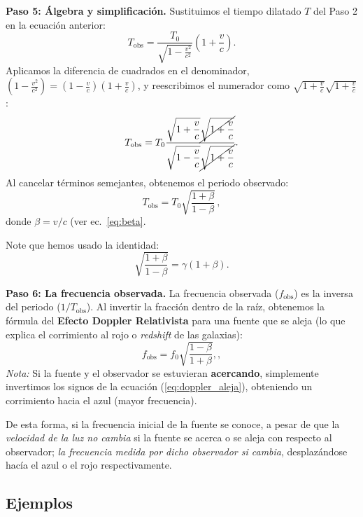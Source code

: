 \documentclass[11pt,a4paper]{book}
\begin{document}
\textbf{Paso 5: Álgebra y simplificación.} Sustituimos el tiempo dilatado $T$ del Paso 2 en la ecuación anterior:
\begin{equation}
    T_{\text{obs}} = \frac{T_0}{\sqrt{1 - \frac{v^2}{c^2}}} \left(1 + \frac{v}{c}\right).
\end{equation}
Aplicamos la diferencia de cuadrados en el denominador, $\left(1 - \frac{v^2}{c^2}\right) = \left(1 - \frac{v}{c}\right)\left(1 + \frac{v}{c}\right)$, y reescribimos el numerador como $\sqrt{1 + \frac{v}{c}} \sqrt{1 + \frac{v}{c}}$:
\begin{equation}
    T_{\text{obs}} = T_0 \frac{\sqrt{1 + \dfrac{v}{c}} \cancel{\sqrt{1 + \dfrac{v}{c}}}}{\sqrt{1 - \dfrac{v}{c}}\cancel{ \sqrt{1 + \dfrac{v}{c}}}}.
\end{equation}
Al cancelar términos semejantes, obtenemos el periodo observado:
\begin{equation}
    T_{\text{obs}} = T_0 \sqrt{\frac{1 + \beta}{1 - \beta}}\,,
\end{equation}
donde $\beta=v/c$ (ver ec.~\eqref{eq:beta}.

Note que hemos usado la identidad:
\begin{equation}
\label{eq:doppid}
 \sqrt{\frac{1+\beta}{1-\beta}} =   \gamma (1+\beta).
\end{equation}


\textbf{Paso 6: La frecuencia observada.} La frecuencia observada ($f_{\text{obs}}$) es la inversa del periodo ($1 / T_{\text{obs}}$). Al invertir la fracción dentro de la raíz, obtenemos la fórmula del \textbf{Efecto Doppler Relativista} para una fuente que se aleja (lo que explica el corrimiento al rojo o \textit{redshift} de las galaxias):
\begin{equation}
    f_{\text{obs}} = f_0 \sqrt{\frac{1 - \beta}{1 + \beta}},,
    \label{eq:doppler_aleja}
\end{equation}
\textit{Nota:} Si la fuente y el observador se estuvieran \textbf{acercando}, simplemente invertimos los signos de la ecuación (\ref{eq:doppler_aleja}), obteniendo un corrimiento hacia el azul (mayor frecuencia).

De esta forma, si la frecuencia inicial de la fuente se conoce, a pesar de que la \emph{velocidad de la luz no cambia} si la fuente se acerca o se aleja con respecto al observador; \emph{la frecuencia medida por dicho observador si cambia}, desplazándose hacía el azul o el rojo respectivamente.

\subsection{Ejemplos}
\end{document}

